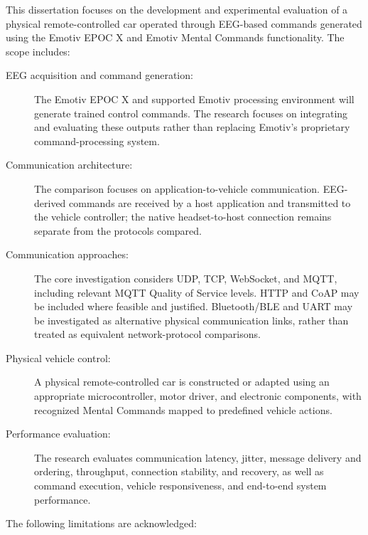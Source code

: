This dissertation focuses on the development and experimental evaluation of a physical remote-controlled car operated through EEG-based commands generated using the Emotiv EPOC X and Emotiv Mental Commands functionality. The scope includes:

\begin{description}
  \item[EEG acquisition and command generation:] The Emotiv EPOC X and supported Emotiv processing environment will generate trained control commands. The research focuses on integrating and evaluating these outputs rather than replacing Emotiv's proprietary command-processing system.
  \item[Communication architecture:] The comparison focuses on application-to-vehicle communication. EEG-derived commands are received by a host application and transmitted to the vehicle controller; the native headset-to-host connection remains separate from the protocols compared.
  \item[Communication approaches:] The core investigation considers UDP, TCP, WebSocket, and MQTT, including relevant MQTT Quality of Service levels. HTTP and CoAP may be included where feasible and justified. Bluetooth/BLE and UART may be investigated as alternative physical communication links, rather than treated as equivalent network-protocol comparisons.
  \item[Physical vehicle control:] A physical remote-controlled car is constructed or adapted using an appropriate microcontroller, motor driver, and electronic components, with recognized Mental Commands mapped to predefined vehicle actions.
  \item[Performance evaluation:] The research evaluates communication latency, jitter, message delivery and ordering, throughput, connection stability, and recovery, as well as command execution, vehicle responsiveness, and end-to-end system performance.
\end{description}

The following limitations are acknowledged:

